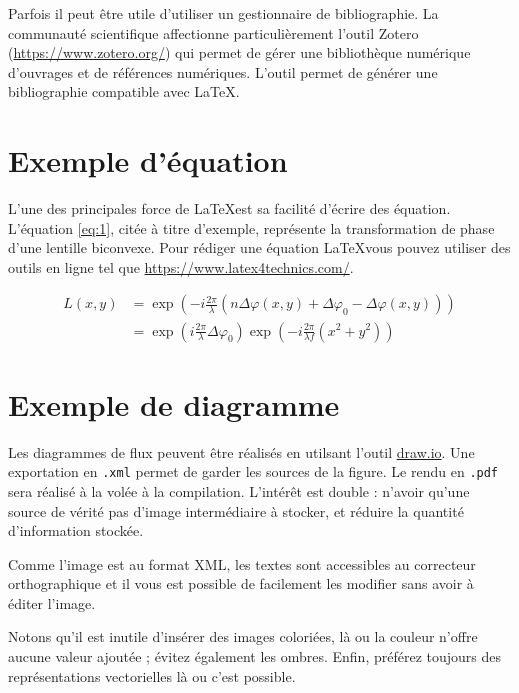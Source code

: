 \documentclass[
    iai, %
    eai  %
]{heig-tb}
\begin{document}
Parfois il peut être utile d'utiliser un gestionnaire de bibliographie. La communauté scientifique affectionne particulièrement l'outil Zotero (\url{https://www.zotero.org/}) qui permet de gérer une bibliothèque numérique d'ouvrages et de références numériques. L'outil permet de générer une bibliographie compatible avec \LaTeX.

\section{Exemple d'équation}
L'une des principales force de \LaTeX est sa facilité d'écrire des équation. L'équation \ref{eq:1}, citée à titre d'exemple, représente la transformation de phase d'une lentille biconvexe. Pour rédiger une équation \LaTeX vous pouvez utiliser des outils en ligne tel que \url{https://www.latex4technics.com/}.

\begin{equation} \label{eq:1}
\begin{split}
L(x,y) &= \exp\left( - i\frac{{2\pi }}{\lambda }\left( {n\Delta \varphi (x,y) + \Delta {\varphi _0} - \Delta \varphi (x,y)} \right)\right)\\
 &= {\exp\left({i\frac{{2\pi }}{\lambda }\Delta {\varphi _0}}\right)}{\exp\left({ - i\frac{{2\pi }}{{\lambda f}}({x^2} + {y^2})}\right)}
\end{split}
\end{equation}

\section{Exemple de diagramme}

Les diagrammes de flux peuvent être réalisés en utilsant l'outil \url{draw.io}. Une exportation en \texttt{.xml} permet de garder les sources de la figure. Le rendu en \texttt{.pdf} sera réalisé à la volée à la compilation. L'intérêt est double : n'avoir qu'une source de vérité \cad pas d'image intermédiaire à stocker, et réduire la quantité d'information stockée.

Comme l'image est au format XML, les textes sont accessibles au correcteur orthographique et il vous est possible de facilement les modifier sans avoir à éditer l'image.


Notons qu'il est inutile d'insérer des images coloriées, là ou la couleur n'offre aucune valeur ajoutée ; évitez également les ombres. Enfin, préférez toujours des représentations vectorielles là ou c'est possible.
\end{document}
